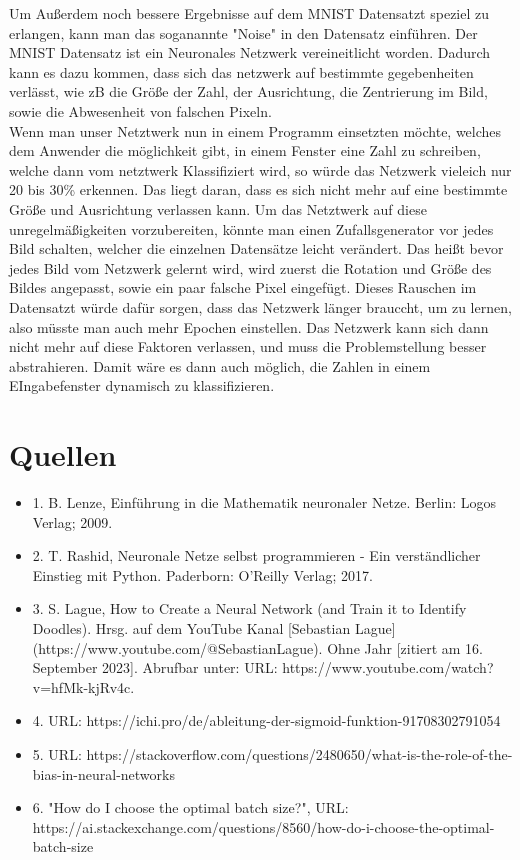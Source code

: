 \documentclass[12pt]{article}
\begin{document}
Um Außerdem noch bessere Ergebnisse auf dem MNIST Datensatzt speziel zu erlangen, kann man das soganannte "Noise" in den Datensatz einführen. Der MNIST Datensatz ist ein Neuronales Netzwerk vereineitlicht worden. Dadurch kann es dazu kommen, dass sich das netzwerk auf bestimmte gegebenheiten verlässt, wie zB die Größe der Zahl, der Ausrichtung, die Zentrierung im Bild, sowie die Abwesenheit von falschen Pixeln.\\
Wenn man unser Netztwerk nun in einem Programm einsetzten möchte, welches dem Anwender die möglichkeit gibt, in einem Fenster eine Zahl zu schreiben, welche dann vom netztwerk Klassifiziert wird, so würde das Netzwerk vieleich nur 20 bis 30\% erkennen. Das liegt daran, dass es sich nicht mehr auf eine bestimmte Größe und Ausrichtung verlassen kann. Um das Netztwerk auf diese unregelmäßigkeiten vorzubereiten, könnte man einen Zufallsgenerator vor jedes Bild schalten, welcher die einzelnen Datensätze leicht verändert. Das heißt bevor jedes Bild vom Netzwerk gelernt wird, wird zuerst die Rotation und Größe des Bildes angepasst, sowie ein paar falsche Pixel eingefügt. Dieses Rauschen im Datensatzt würde dafür sorgen, dass das Netzwerk länger brauccht, um zu lernen, also müsste man auch mehr Epochen einstellen. Das Netzwerk kann sich dann nicht mehr auf diese Faktoren verlassen, und muss die Problemstellung besser abstrahieren. Damit wäre es dann auch möglich, die Zahlen in einem EIngabefenster dynamisch zu klassifizieren.\\


\cleardoublepage
\section{Quellen}
\begin{itemize}
\item 1. B. Lenze, Einführung in die Mathematik neuronaler Netze. Berlin: Logos Verlag; 2009.
\item 2. T. Rashid, Neuronale Netze selbst programmieren - Ein verständlicher Einstieg mit Python. Paderborn: O’Reilly Verlag; 2017.
\item 3. S. Lague, How to Create a Neural Network (and Train it to Identify Doodles). Hrsg. auf dem YouTube Kanal [Sebastian Lague](https://www.youtube.com/@SebastianLague). Ohne Jahr [zitiert am 16. September 2023]. Abrufbar unter: URL: https://www.youtube.com/watch?v=hfMk-kjRv4c.
\item 4. URL: https://ichi.pro/de/ableitung-der-sigmoid-funktion-91708302791054
\item 5. URL: https://stackoverflow.com/questions/2480650/what-is-the-role-of-the-bias-in-neural-networks
\item 6. "How do I choose the optimal batch size?", URL: https://ai.stackexchange.com/questions/8560/how-do-i-choose-the-optimal-batch-size
\end{itemize}

\cleardoublepage
{}
\listoffigures
\end{document}
